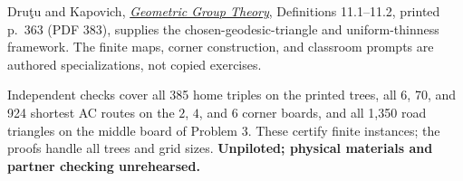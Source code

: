 \documentclass[11pt,letterpaper]{article}
\newcommand{\heading}[1]{\par\vspace{5pt}{\large\bfseries #1}\par}
\begin{document}
\heading{Sources and checking limits}
Dru\c{t}u and Kapovich, \href{https://www.math.ucdavis.edu/~kapovich/EPR/ggt.pdf}{\emph{Geometric Group Theory}}, Definitions 11.1--11.2, printed p.\ 363 (PDF 383), supplies the chosen-geodesic-triangle and uniform-thinness framework. The finite maps, corner construction, and classroom prompts are authored specializations, not copied exercises.

Independent checks cover all 385 home triples on the printed trees, all 6, 70, and 924 shortest AC routes on the $2$, $4$, and $6$ corner boards, and all 1,350 road triangles on the middle board of Problem 3. These certify finite instances; the proofs handle all trees and grid sizes. \textbf{Unpiloted; physical materials and partner checking unrehearsed.}
\end{document}
